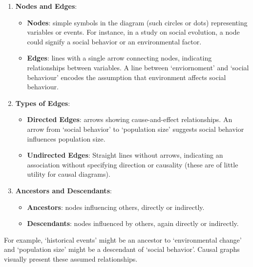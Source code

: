\documentclass[
  singlecolumn,
  9pt]{article}
\providecommand{\tightlist}{%
  \setlength{\itemsep}{0pt}\setlength{\parskip}{0pt}}\usepackage{longtable,booktabs,array}
\begin{document}
\begin{enumerate}
\def\labelenumi{\arabic{enumi}.}
\tightlist
\item
  \textbf{Nodes and Edges}:

  \begin{itemize}
  \tightlist
  \item
    \textbf{Nodes}: simple symbols in the diagram (such circles or dots)
    representing variables or events. For instance, in a study on social
    evolution, a node could signify a social behavior or an
    environmental factor.
  \item
    \textbf{Edges}: lines with a single arrow connecting nodes,
    indicating relationships between variables. A line between
    `enviornoment' and `social behaviour' encodes the assumption that
    environment affects social behaviour.
  \end{itemize}
\item
  \textbf{Types of Edges}:

  \begin{itemize}
  \tightlist
  \item
    \textbf{Directed Edges}: arrows showing cause-and-effect
    relationships. An arrow from `social behavior' to `population size'
    suggests social behavior influences population size.
  \item
    \textbf{Undirected Edges}: Straight lines without arrows, indicating
    an association without specifying direction or causality (these are
    of little utility for causal diagrams).
  \end{itemize}
\item
  \textbf{Ancestors and Descendants}:

  \begin{itemize}
  \tightlist
  \item
    \textbf{Ancestors}: nodes influencing others, directly or
    indirectly.
  \item
    \textbf{Descendants}: nodes influenced by others, again directly or
    indirectly.
  \end{itemize}
\end{enumerate}

For example, `historical events' might be an ancestor to `environmental
change' and `population size' might be a descendant of `social
behavior'. Causal graphs visually present these assumed relationships.
\end{document}
